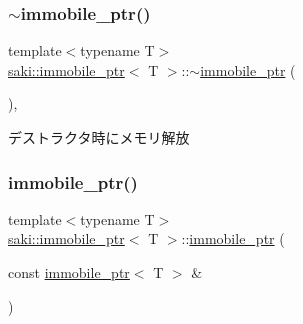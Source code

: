 \subsubsection{\texorpdfstring{$\sim$immobile\+\_\+ptr()}{~immobile\_ptr()}}
{\footnotesize\ttfamily template$<$typename T$>$ \\
\mbox{\hyperlink{classsaki_1_1immobile__ptr}{saki\+::immobile\+\_\+ptr}}$<$ T $>$\+::$\sim$\mbox{\hyperlink{classsaki_1_1immobile__ptr}{immobile\+\_\+ptr}} (\begin{DoxyParamCaption}{ }\end{DoxyParamCaption})\hspace{0.3cm}{\ttfamily [inline]}, {\ttfamily [noexcept]}}



デストラクタ時にメモリ解放 

\mbox{\label{classsaki_1_1immobile__ptr_ad0648153ed2d219d9cdf338a106de07c}} 
\subsubsection{\texorpdfstring{immobile\+\_\+ptr()}{immobile\_ptr()}\hspace{0.1cm}{\footnotesize\ttfamily [2/3]}}
{\footnotesize\ttfamily template$<$typename T$>$ \\
\mbox{\hyperlink{classsaki_1_1immobile__ptr}{saki\+::immobile\+\_\+ptr}}$<$ T $>$\+::\mbox{\hyperlink{classsaki_1_1immobile__ptr}{immobile\+\_\+ptr}} (\begin{DoxyParamCaption}\item[{const \mbox{\hyperlink{classsaki_1_1immobile__ptr}{immobile\+\_\+ptr}}$<$ T $>$ \&}]{ }\end{DoxyParamCaption})\hspace{0.3cm}{\ttfamily [delete]}}

\mbox{\label{classsaki_1_1immobile__ptr_a06b9308842f0179d5705caadd90718b0}} 
